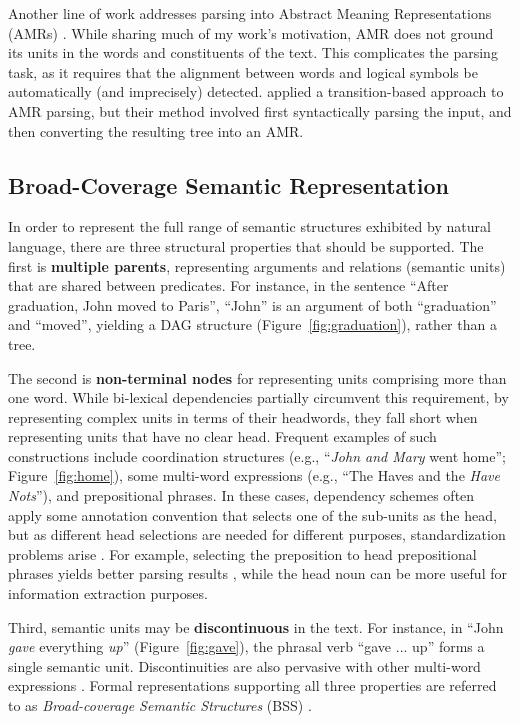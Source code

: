 \documentclass[11pt]{article}
\newcommand{\figref}[1]{Figure~\ref{#1}}
\begin{document}
Another line of work addresses parsing into Abstract Meaning Representations (AMRs)
\cite{flanigan2014discriminative,vanderwende2015amr,pust2015parsing,artzi2015broad}. 
While sharing much of my work's motivation,
AMR does not ground its units in the words and constituents of the text.
This complicates the parsing task, as it requires
that the alignment between words and logical symbols be automatically
(and imprecisely) detected.
\cite{wang2015transition} applied a transition-based approach to AMR parsing,
but their method involved first syntactically parsing the input, and then converting
the resulting tree into an AMR.

\subsection{Broad-Coverage Semantic Representation}\label{sec:broad_coverage}

In order to represent the full range of semantic structures exhibited by
natural language, there are three structural properties that should be supported.
The first is \textbf{multiple parents},
representing arguments and relations (semantic units) that are shared between predicates.
For instance, in the sentence
``After graduation, John moved to Paris'', ``John'' is an argument of both ``graduation''
and ``moved'', yielding a DAG structure (\figref{fig:graduation}), rather than a tree.

The second is \textbf{non-terminal nodes} for representing units
comprising more than one word.
While bi-lexical dependencies partially circumvent this requirement, by
representing complex units in terms of their headwords, they fall short
when representing units that have no clear head.
Frequent examples of such constructions include
coordination structures (e.g., ``\textit{John and Mary} went home''; \figref{fig:home}),
some multi-word expressions (e.g., ``The Haves and the \textit{Have Nots}''),
and prepositional phrases.
In these cases, dependency schemes often apply some annotation convention that
selects one of the sub-units
as the head, but as different head selections are needed for different purposes,
standardization problems arise \cite{Ivanova2012who}.
For example, selecting the preposition to head prepositional phrases yields better
parsing results \cite{Schwartz:12}, while the head noun can be more useful for
information extraction purposes.

Third, semantic units may be \textbf{discontinuous} in the text. For instance, in
``John \textit{gave} everything \textit{up}''
(\figref{fig:gave}), the phrasal verb ``gave ... up'' forms a single semantic unit.
Discontinuities are also pervasive with other multi-word
expressions \cite{schneider2014discriminative}.
Formal representations supporting all three properties are referred to as
{\it Broad-coverage Semantic Structures} (BSS) \cite{hershcovich2016broad}.
\end{document}
